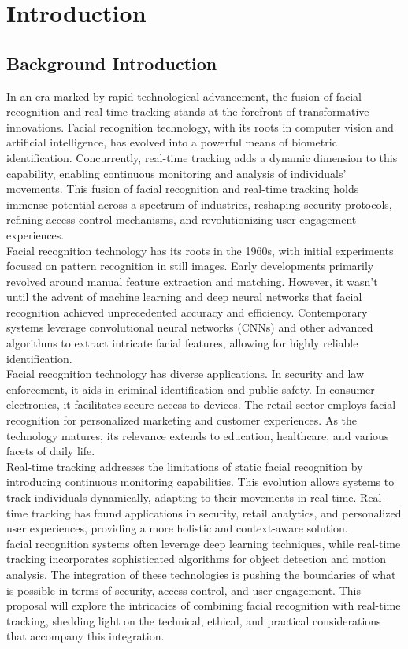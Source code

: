 \chapter{Introduction}


        \section{Background Introduction}
        In an era marked by rapid technological advancement, the fusion of facial recognition and real-time tracking stands at the forefront of transformative innovations. Facial recognition technology, with its roots in computer vision and artificial intelligence, has evolved into a powerful means of biometric identification. Concurrently, real-time tracking adds a dynamic dimension to this capability, enabling continuous monitoring and analysis of individuals' movements. This fusion of facial recognition and real-time tracking holds immense potential across a spectrum of industries, reshaping security protocols, refining access control mechanisms, and revolutionizing user engagement experiences.\\
Facial recognition technology has its roots in the 1960s, with initial experiments focused on pattern recognition in still images. Early developments primarily revolved around manual feature extraction and matching. However, it wasn't until the advent of machine learning and deep neural networks that facial recognition achieved unprecedented accuracy and efficiency. Contemporary systems leverage convolutional neural networks (CNNs) and other advanced algorithms to extract intricate facial features, allowing for highly reliable identification.\\
Facial recognition technology has diverse applications. In security and law enforcement, it aids in criminal identification and public safety. In consumer electronics, it facilitates secure access to devices. The retail sector employs facial recognition for personalized marketing and customer experiences. As the technology matures, its relevance extends to education, healthcare, and various facets of daily life.\\
Real-time tracking addresses the limitations of static facial recognition by introducing continuous monitoring capabilities. This evolution allows systems to track individuals dynamically, adapting to their movements in real-time. Real-time tracking has found applications in security, retail analytics, and personalized user experiences, providing a more holistic and context-aware solution.\\
facial recognition systems often leverage deep learning techniques, while real-time tracking incorporates sophisticated algorithms for object detection and motion analysis. The integration of these technologies is pushing the boundaries of what is possible in terms of security, access control, and user engagement.
This proposal will explore the intricacies of combining facial recognition with real-time tracking, shedding light on the technical, ethical, and practical considerations that accompany this integration.

